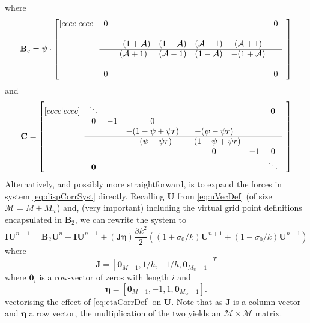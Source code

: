 \documentclass[dvipsnames]{article}
\def\I{\mathbf{I}}
\def\B{\mathbf{B}}
\def\C{\mathbf{C}}
\def\U{\mathbf{U}}
\def\J{\mathbf{J}}
\def\Iterm{\mathcal{A}}
\begin{document}
where
\begin{equation}
    \mathbf{B}_c = \psi \cdot \begin{bmatrix}[cccc|cccc]
     & 0  & & & & & 0 & \\
       & & & & & & & \\
      & & -(1+\Iterm) & (1-\Iterm) & (\Iterm-1) & (\Iterm + 1) & \\ \cline{2-7}
      & & (\Iterm+1) & (\Iterm-1) & (1-\Iterm) &-(1+\Iterm) & & \\
         & & & & & &  \\
         & 0 & &  &  & & 0 &
    \end{bmatrix}
\end{equation}
and 
\begin{equation}
    \C = \begin{bmatrix}[cccc|cccc]
     & \ddots  & & & & & \mathbf{0} & \\
       & 0 & -1 & 0 & & & & \\
      & &  & -(1-\psi + \psi r) & -(\psi - \psi r)  &  & \\ \cline{2-7}
      & &  & -(\psi - \psi r)& -(1-\psi + \psi r)  &  & & \\
         & & & & 0 & -1 & 0 \\
         & \mathbf{0} & &  &  & & \ddots &
    \end{bmatrix}
\end{equation}
Alternatively, and possibly more straightforward, is to expand the forces in system \eqref{eq:dispCorrSyst} directly. 
Recalling $\U$ from \eqref{eq:uVecDef} (of size $\mathcal{M} = M+M_w$) and, (very important) including the virtual grid point definitions encapsulated in $\B_2$, we can rewrite the system to
\begin{equation}
    \I\U^{n+1} = \B_2\U^n - \I\U^{n-1} + (\J\boldsymbol{\eta})\frac{\beta k^2}{2}\left((1+\sigma_0/k)\U^{n+1} + (1-\sigma_0/k)\U^{n-1}\right)
\end{equation}
where 
\begin{equation}
    \J = [\mathbf{0}_{M-1}, 1/h, -1/h, \mathbf{0}_{M_w-1}]^T
\end{equation}
where $\mathbf{0}_i$ is a row-vector of zeros with length $i$ and
\begin{equation}
    \boldsymbol{\eta} = [\mathbf{0}_{M-1}, -1, 1, \mathbf{0}_{M_w-1}].
\end{equation}
vectorising the effect of \eqref{eq:etaCorrDef} on $\U$. Note that as $\J$ is a column vector and $\boldsymbol{\eta}$ a row vector, the multiplication of the two yields an $\mathcal{M}\times\mathcal{M}$ matrix.
\end{document}
